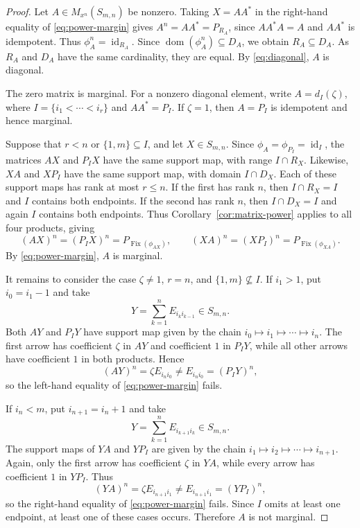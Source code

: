 \documentclass[11pt,a4paper,reqno]{amsart}
\newcommand{\Sn}{S_{m,n}}
\newcommand{\Mn}{M_{x^n}}
\newcommand{\id}{\operatorname{id}}
\DeclareMathOperator{\Fix}{Fix}
\DeclareMathOperator{\dom}{dom}
\numberwithin{equation}{section}
\begin{document}
\begin{proof}
Let $A\in\Mn(\Sn)$ be nonzero. Taking $X=AA^*$ in the right-hand
equality of \eqref{eq:power-margin} gives
$A^n=AA^*=P_{R_A}$, since $AA^*A=A$ and $AA^*$ is idempotent.
Thus $\phi_A^n=\id_{R_A}$. Since $\dom(\phi_A^n)\subseteq D_A$, we
obtain $R_A\subseteq D_A$. As $R_A$ and $D_A$ have the same
cardinality, they are equal. By \eqref{eq:diagonal}, $A$ is diagonal.

The zero matrix is marginal. For a nonzero diagonal element, write
$A=d_I(\zeta)$, where $I=\{i_1<\cdots<i_r\}$ and $AA^*=P_I$.
If $\zeta=1$, then $A=P_I$ is idempotent and hence marginal.

Suppose that $r<n$ or $\{1,m\}\subseteq I$, and let $X\in\Sn$.
Since $\phi_A=\phi_{P_I}=\id_I$, the matrices $AX$ and $P_IX$ have
the same support map, with range $I\cap R_X$. Likewise, $XA$ and
$XP_I$ have the same support map, with domain $I\cap D_X$.
Each of these support maps has rank at most $r\leq n$.
If the first has rank $n$, then $I\cap R_X=I$ and $I$ contains both
endpoints. If the second has rank $n$, then $I\cap D_X=I$ and again
$I$ contains both endpoints. Thus Corollary~\ref{cor:matrix-power}
applies to all four products, giving
$$
(AX)^n=(P_IX)^n=P_{\Fix(\phi_{AX})},
\qquad
(XA)^n=(XP_I)^n=P_{\Fix(\phi_{XA})}.
$$
By \eqref{eq:power-margin}, $A$ is marginal.

It remains to consider the case $\zeta\neq 1$, $r=n$, and
$\{1,m\}\nsubseteq I$. If $i_1>1$, put $i_0=i_1-1$ and take
$$
Y=\sum_{k=1}^{n}E_{i_k i_{k-1}}\in\Sn.
$$
Both $AY$ and $P_IY$ have support map given by the chain
$i_0\mapsto i_1\mapsto\cdots\mapsto i_n$. The first arrow has
coefficient $\zeta$ in $AY$ and coefficient $1$ in $P_IY$, while
all other arrows have coefficient $1$ in both products. Hence
$$
(AY)^n=\zeta E_{i_n i_0}\neq E_{i_n i_0}=(P_IY)^n,
$$
so the left-hand equality of \eqref{eq:power-margin} fails.

If $i_n<m$, put $i_{n+1}=i_n+1$ and take
$$
Y=\sum_{k=1}^{n}E_{i_{k+1}i_k}\in\Sn.
$$
The support maps of $YA$ and $YP_I$ are given by the chain
$i_1\mapsto i_2\mapsto\cdots\mapsto i_{n+1}$. Again, only the
first arrow has coefficient $\zeta$ in $YA$, while every arrow
has coefficient $1$ in $YP_I$. Thus
$$
(YA)^n=\zeta E_{i_{n+1}i_1}\neq E_{i_{n+1}i_1}=(YP_I)^n,
$$
so the right-hand equality of \eqref{eq:power-margin} fails.
Since $I$ omits at least one endpoint, at least one of these cases
occurs. Therefore $A$ is not marginal.
\end{proof}
\end{document}

